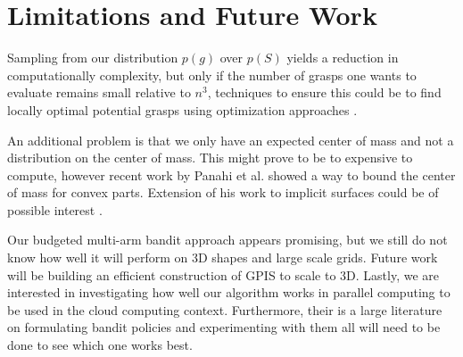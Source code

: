 \documentclass[letterpaper, 10 pt, conference]{ieeeconf}  %
\begin{document}
\section{Limitations and Future Work}
Sampling from our distribution $p(g)$ over $p(S)$ yields a reduction in computationally complexity, but only if the number of grasps one wants to evaluate remains small relative to $n^3$, techniques to ensure this could be to find locally optimal potential grasps using optimization approaches \cite{jeffs}. 

An additional problem is that we only have an expected center of mass and not a distribution on the center of mass. This might prove to be to expensive to compute, however recent work by Panahi et al. showed a way to bound the center of mass for convex parts. Extension of his work to implicit surfaces could be of possible interest \cite{panahi2014bounding}.  

Our budgeted multi-arm bandit approach appears promising, but we still do not know how well it will perform on 3D shapes and large scale grids. Future work will be building an efficient construction of GPIS to scale to 3D. Lastly, we are interested in investigating how well our algorithm works in parallel computing to be used in the cloud computing context. Furthermore, their is a large literature on formulating bandit policies and experimenting with them all will need to be done to see which one works best. 



\end{document}
